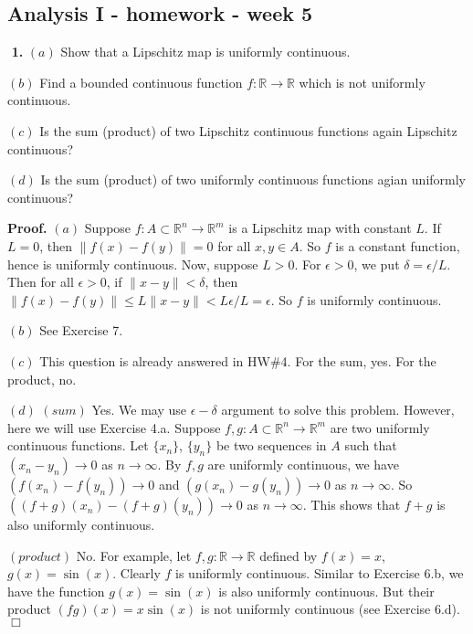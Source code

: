 \documentclass{article}
\begin{document}
    
    
    
    
    

    
    \subsection*{Analysis I - homework - week
5}\label{analysis-i---homework---week-5}

    $\newcommand{\cl}{\operatorname{cl}}$ \textbf{1.} $(a)$ Show that a
Lipschitz map is uniformly continuous.

$(b)$ Find a bounded continuous function $f:\mathbb{R}\to \mathbb{R}$
which is not uniformly continuous.

$(c)$ Is the sum (product) of two Lipschitz continuous functions again
Lipschitz continuous?

$(d)$ Is the sum (product) of two uniformly continuous functions agian
uniformly continuous?

\textbf{Proof.} $(a)$ Suppose $f:A\subset \mathbb{R}^n \to \mathbb{R}^m$
is a Lipschitz map with constant $L$. If $L = 0$, then
$\|f(x) - f(y)\| = 0$ for all $x,y \in A$. So $f$ is a constant
function, hence is uniformly continuous. Now, suppose $L > 0$. For
$\epsilon > 0$, we put $\delta = \epsilon /L$. Then for all
$\epsilon > 0$, if $\|x - y\| < \delta$, then
$\|f(x) -f(y)\|\le L \|x-y\| < L\epsilon/L = \epsilon$. So $f$ is
uniformly continuous.

$(b)$ See Exercise 7.

$(c)$ This question is already answered in HW\#4. For the sum, yes. For
the product, no.

$(d)$ $(sum)$ Yes. We may use $\epsilon-\delta$ argument to solve this
problem. However, here we will use Exercise 4.a. Suppose
$f,g:A\subset \mathbb{R}^n \to \mathbb{R}^m$ are two uniformly
continuous functions. Let $\{x_n\}$, $\{y_n\}$ be two sequences in $A$
such that $(x_n-y_n) \to 0$ as $n\to \infty$. By $f,g$ are uniformly
continuous, we have $(f(x_n) -f(y_n)) \to 0$ and $(g(x_n)-g(y_n)) \to 0$
as $n\to \infty$. So $((f+g)(x_n) - (f+g)(y_n)) \to 0$ as $n\to\infty$.
This shows that $f+g$ is also uniformly continuous.

$(product)$ No. For example, let $f,g:\mathbb{R}\to \mathbb{R}$ defined
by $f(x) = x$, $g(x) = \sin(x)$. Clearly $f$ is uniformly continuous.
Similar to Exercise 6.b, we have the function $g(x)=\sin(x)$ is also
uniformly continuous. But their product $(fg)(x) = x\sin(x)$ is not
uniformly continuous (see Exercise 6.d). $\Box$
\end{document}
